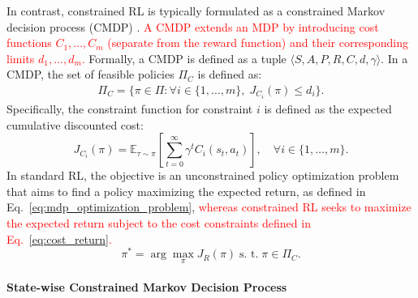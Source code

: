 In contrast, constrained RL is typically formulated as a constrained Markov decision process (CMDP) \cite{altman2021constrained}.
\textcolor{red}{A CMDP extends an MDP by introducing cost functions $C_1, \ldots, C_m$ (separate from the reward function) and their corresponding limits $d_1, \ldots, d_m$.}
Formally, a CMDP is defined as a tuple $\langle S, A, P, R, C, d, \gamma \rangle$.
In a CMDP, the set of feasible policies $\Pi_C$ is defined as:
\begin{equation} \label{eq:feasible_policy_set_cmdp}
    \begin{aligned}
        \Pi_C = \{ \pi \in \Pi: \forall i \in \{1, \ldots, m\}, \; J_{C_i}(\pi) \leq d_i \}.
    \end{aligned}
\end{equation}
Specifically, the constraint function for constraint $i$ is defined as the expected cumulative discounted cost:
\begin{equation} \label{eq:cost_return}
    J_{C_i}(\pi) = \mathbb{E}_{\tau \sim \pi}\!\left[\sum^\infty_{t = 0} \gamma^t C_i(s_t, a_t)\right], 
    \quad \forall i \in \{1, \ldots, m\}.
\end{equation}
In standard RL, the objective is an unconstrained policy optimization problem that aims to find a policy maximizing the expected return, as defined in Eq.~\eqref{eq:mdp_optimization_problem}, \textcolor{red}{whereas constrained RL seeks to maximize the expected return subject to the cost constraints defined in Eq.~\eqref{eq:cost_return}.}
\begin{equation} \label{eq:cmdp_optimization_problem}
    \pi^* = \arg\max_\pi J_R(\pi) \; \text{s. t.} \; \pi \in \Pi_C.
\end{equation}


\paragraph{\textbf{State-wise Constrained Markov Decision Process}}

